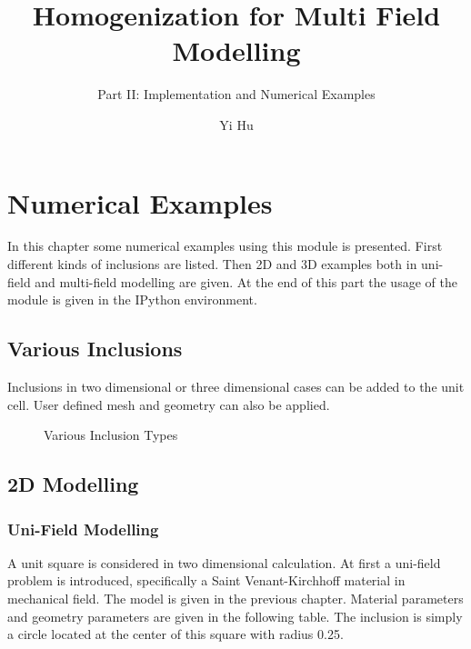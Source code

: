 \documentclass[10pt,a4paper]{scrreprt}
\author{Yi Hu}
\title{Homogenization for Multi Field Modelling}
\subtitle{Part II: Implementation and Numerical Examples}
\begin{document}
\chapter{Numerical Examples}
In this chapter some numerical examples using this module is presented. First different kinds of inclusions are listed. Then 2D and 3D examples both in uni-field and multi-field modelling are given. At the end of this part the usage of the module is given in the IPython environment.

\section{Various Inclusions}
Inclusions in two dimensional or three dimensional cases can be added to the unit cell. User defined mesh and geometry can also be applied.

\begin{figure}[h]
  \centering
  \caption{Various Inclusion Types}
  \label{fig: inc} %
\end{figure} 

\section{2D Modelling}
\subsection{Uni-Field Modelling}
A unit square is considered in two dimensional calculation. At first a uni-field problem is introduced, specifically a Saint Venant-Kirchhoff material in mechanical field. The model is given in the previous chapter. Material parameters and geometry parameters are given in the following table. The inclusion is simply a circle located at the center of this square with radius 0.25. \\
\end{document}
